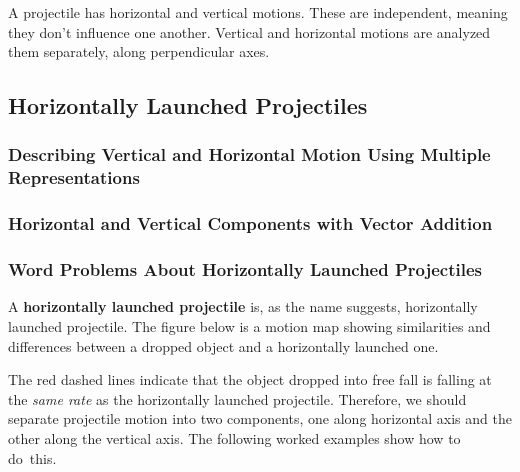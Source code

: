 \documentclass[dvipsnames]{article}
\begin{document}
A projectile has horizontal and vertical motions. These are independent, meaning they don't influence one another. Vertical and horizontal motions are analyzed them separately, along perpendicular axes.

\subsection{Horizontally Launched Projectiles}
\subsubsection{Describing Vertical and Horizontal Motion Using Multiple Representations}

\subsubsection{Horizontal and Vertical Components with Vector Addition}

\subsubsection{Word Problems About Horizontally Launched Projectiles}

A \textbf{\gls{horizontally launched projectile}} is, as the name suggests, \glsdesc{horizontally launched projectile}. The figure below is a motion map showing similarities and differences between a dropped object and a horizontally launched one.

\begin{center}
\end{center}

The red dashed lines indicate that the object dropped into free fall is falling at the \textit{same rate} as the horizontally launched projectile. Therefore, we should separate projectile motion into two components, one along horizontal axis and the other along the vertical axis. The following worked examples show how to do~this.
\end{document}
